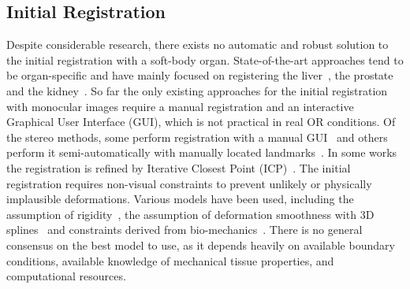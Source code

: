 \subsection{Initial Registration}

Despite considerable research, there exists no automatic and robust solution to the initial registration with a soft-body organ. State-of-the-art approaches tend to be organ-specific and have mainly focused on registering the liver~\cite{haouchine13,haouchine:hal-01186011,plantefeve:hal-01205194}, the prostate~\cite{Cohen2010Prostate} and the kidney~\cite{Su2009,nosrati2014simultaneous,affineTracking}.
So far the only existing approaches for the initial registration with monocular images require a manual registration \cite{affineTracking} and an interactive Graphical User Interface (GUI), which is not practical in real OR conditions. 
Of the stereo methods, some perform registration with a manual GUI~\cite{Cohen2010Prostate,haouchine13} and others perform it semi-automatically with manually located landmarks~\cite{21142942,conf/miccai/Amir-KhaliliNPHA13,hamarneh2014igrs,Su2009}. In some works the registration is refined by Iterative Closest Point (ICP)~\cite{hamarneh2014igrs,Su2009}. %
The initial registration requires non-visual constraints to prevent unlikely or physically implausible deformations. Various models have been used, including the assumption of rigidity~\cite{Su2009}, the assumption of deformation smoothness with 3D splines~\cite{conf/miccai/Amir-KhaliliNPHA13} and constraints derived from bio-mechanics~\cite{hamarneh2014igrs,haouchine13}. 
There is no general consensus on the best model to use, as it depends heavily on available boundary conditions, available knowledge of mechanical tissue properties, and computational resources. 

